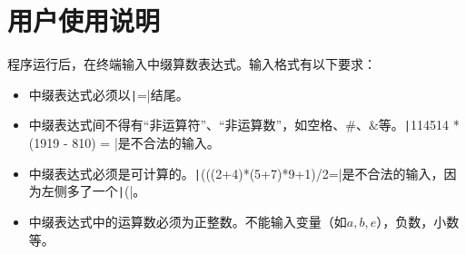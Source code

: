 \documentclass[10pt,a4paper]{article}
\begin{document}
	\section{用户使用说明}
	\noindent 程序运行后，在终端输入中缀算数表达式。输入格式有以下要求：
	\begin{itemize}
		\item 中缀表达式必须以\texttt|=|结尾。
		\item 中缀表达式间不得有“非运算符”、“非运算数”，如空格、$\#$、$\&$等。\texttt|114514 * (1919 - 810) = |是不合法的输入。
		\item 中缀表达式必须是可计算的。\texttt|(((2+4)*(5+7)*9+1)/2=|是不合法的输入，因为左侧多了一个\texttt|(|。
		\item 中缀表达式中的运算数必须为正整数。不能输入变量（如$a,b,e$），负数，小数等。
	\end{itemize}
	\newpage
\end{document}
